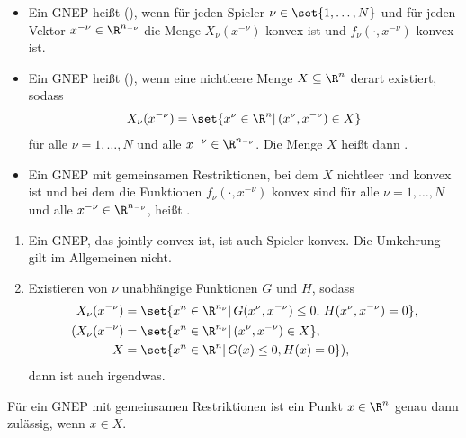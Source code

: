 \begin{definition*}
  \begin{itemize}
  \item Ein GNEP heißt  (), wenn für jeden Spieler $\nu \in \set{1, \dots, N}$ und für jeden Vektor $x^{-\nu} \in \R^{n_{-\nu}}$ die Menge $X_{\nu}(x^{-\nu})$ konvex ist und $f_{\nu}(\cdot, x^{-\nu})$ konvex ist. 
\item Ein GNEP heißt  (), wenn eine nichtleere Menge $X \subseteq \R^{n}$ derart existiert, sodass
  \begin{align*}
    X_{\nu} (x^{-\nu}) = \set{x^{\nu} \in \R^{n}|\, (x^{\nu}, x^{-\nu}) \in X}
  \end{align*}
für alle $\nu = 1, \dots, N$ und alle $x^{-\nu} \in \R^{n_{-\nu}}$. Die Menge $X$ heißt dann . 
\item Ein GNEP mit gemeinsamen Restriktionen, bei dem $X$ nichtleer und konvex ist und bei dem die Funktionen $f_{\nu}(\cdot, x^{-\nu})$ konvex sind für alle $\nu = 1, \dots, N$ und alle $x^{-\nu} \in \R^{n_{-\nu}}$, heißt . 
\end{itemize}
\end{definition*}
\begin{bemerkung*}
  \begin{enumerate}
  \item Ein GNEP, das jointly convex ist, ist auch Spieler-konvex. Die Umkehrung gilt im Allgemeinen nicht. 
  \item Existieren von $\nu$ unabhängige Funktionen $G$ und $H$, sodass 
    \begin{align*}
      X_{\nu}(x^{-\nu})&= \set{x^{n} \in \R^{n_{\nu}}|\, G(x^{\nu}, x^{-\nu})\leq 0, \, H(x^{\nu}, x^{-\nu})=0}, \\
      (X_{\nu}(x^{-\nu})&= \set{x^{n} \in \R^{n_{\nu}}|\, (x^{\nu}, x^{-\nu}) \in X}, \\
      X &= \set{x^{n} \in \R^{n}|\, G(x) \leq 0, H(x)= 0}), 
    \end{align*}
dann ist auch irgendwas. 
  \end{enumerate}
\end{bemerkung*}
\begin{proposition}\label{prop:4-2}
  Für ein GNEP mit gemeinsamen Restriktionen ist ein Punkt $x \in \R^{n}$ genau dann zulässig, wenn $x \in X$. 
\end{proposition}
